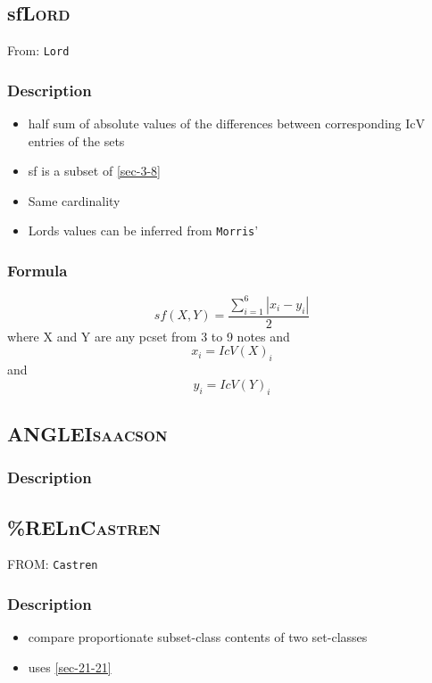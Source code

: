 \documentclass[11pt]{article}
\begin{document}
\subsection{sf\hfill{}\textsc{Lord}}
\label{sec-3-16}
From: \texttt{Lord}
\subsubsection{Description}
\label{sec-3-16-1}
\begin{itemize}
\item half sum of absolute values of the differences between
corresponding IcV entries of the sets
\item sf is a subset of \ref{sec-3-8}
\item Same cardinality
\item Lords values can be inferred from \texttt{Morris}'
\end{itemize}

\subsubsection{Formula}
\label{sec-3-16-2}
$$  sf \left ( X,Y \right ) = \frac{ \sum_{i = 1}^{6} \left | x_{i} - y_{i} \right |}{2}  $$
where X and Y are any pcset from 3 to 9 notes and
$$ x_{i} = IcV(X)_{i} $$ and $$ y_{i} = IcV(Y)_{i} $$

\subsection{ANGLE\hfill{}\textsc{Isaacson}}
\label{sec-3-17}
\subsubsection{Description}
\label{sec-3-17-1}

\subsection{\%RELn\hfill{}\textsc{Castren}}
\label{sec-3-18}
FROM: \texttt{Castren}
\subsubsection{Description}
\label{sec-3-18-1}
\begin{itemize}
\item compare proportionate subset-class contents of two set-classes
\item uses \ref{sec-21-21}
\end{itemize}
\end{document}
